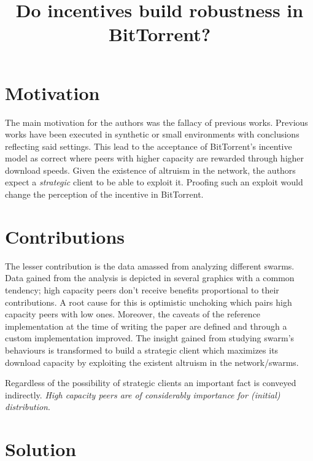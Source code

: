 \documentclass[conference]{IEEEtran}
\begin{document}
\title{Do incentives build robustness in BitTorrent?}


\author{
\and
{}
}
\maketitle
\IEEEpeerreviewmaketitle



\section{Motivation}
The main motivation for the authors was the fallacy of previous works.
Previous works have been executed in synthetic or small environments with conclusions reflecting said settings.
This lead to the acceptance of BitTorrent's incentive model as correct where peers with higher capacity are rewarded through higher download speeds.
Given the existence of altruism in the network, the authors expect a \emph{strategic} client to be able to exploit it.
Proofing such an exploit would change the perception of the incentive in BitTorrent.


\section{Contributions}
The lesser contribution is the data amassed from analyzing different swarms.
Data gained from the analysis is depicted in several graphics with a common tendency; high capacity peers don't receive benefits proportional to their contributions.
A root cause for this is optimistic unchoking which pairs high capacity peers with low ones.
Moreover, the caveats of the reference implementation at the time of writing the paper are defined and through a custom implementation improved.
The insight gained from studying swarm's behaviours is transformed to build a strategic client which maximizes its download capacity by exploiting the existent altruism in the network/swarms.

Regardless of the possibility of strategic clients an important fact is conveyed indirectly.
\emph{High capacity peers are of considerably importance for (initial) distribution}.



\section{Solution}
\end{document}
